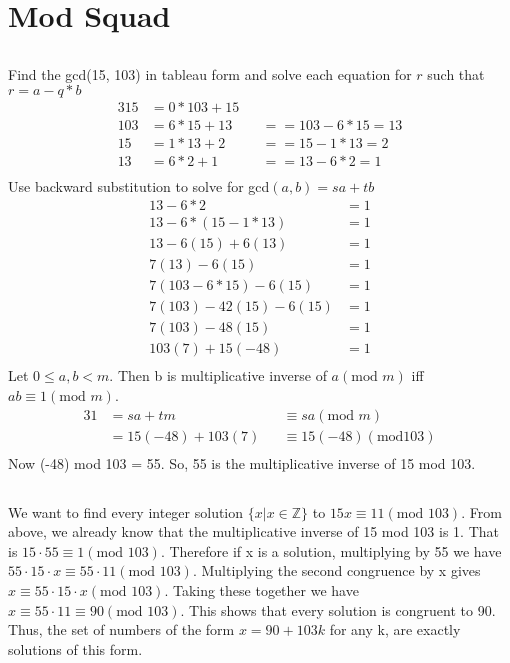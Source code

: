\documentclass[11pt]{article}
\newcommand{\Z}{\mathbb{Z}}
\begin{document}
\section{Mod Squad} %
\subsection{} %
Find the gcd(15, 103) in tableau form and solve each equation for $r$ such that $r = a - q * b$
\begin{alignat*}{3}
	15 &= 0 * 103 + 15 && \\
	103 &= 6 * 15 + 13  &&== 103 - 6 * 15 = 13 \\
	15 &= 1 * 13 + 2 &&== 15 - 1 * 13 = 2 \\
	13 &= 6 * 2 + 1 &&== 13 - 6 * 2 = 1\\
\end{alignat*}
Use backward substitution to solve for gcd$(a, b) = sa + tb$
\begin{align*}
	13 - 6 * 2 &= 1 \\
	13 - 6 * (15 - 1 * 13) &= 1 \\
	13 - 6(15) + 6(13) &= 1 \\
	7(13) - 6(15) &= 1 \\
	7(103 - 6 * 15) - 6(15) &= 1 \\
	7(103) - 42(15) - 6(15) &= 1 \\
	7(103) - 48(15) &= 1 \\
	103(7) + 15(-48) &= 1 \\
\end{align*}
Let $0 \leq a,b < m$. Then b is multiplicative inverse of $a(\text{mod } m)$ iff $ab \equiv 1 (\text{mod } m)$. 
\begin{alignat*}{3}
	1 &= sa + tm &&\equiv sa(\text{mod } m) \\
	&= 15(-48) + 103(7) &&\equiv 15(-48) (\text{mod} 103) \\
\end{alignat*}
Now (-48) mod 103 = 55. So, 55 is the multiplicative inverse of 15 mod 103. 

\subsection{} %
We want to find every integer solution $\{x | x \in \Z\}$ to $15x \equiv 11 (\text{mod } 103)$. From above, we already know that the multiplicative inverse of 15 mod 103 is 1. That is $15 \cdot 55 \equiv 1 (\text{mod } 103)$. Therefore if x is a solution, multiplying by 55 we have $55 \cdot 15 \cdot x \equiv 55 \cdot 11 (\text{mod } 103)$. Multiplying the second congruence by x gives $x \equiv 55 \cdot 15 \cdot x (\text{mod } 103)$. Taking these together we have $x \equiv 55 \cdot 11 \equiv 90 (\text{mod } 103)$. This shows that every solution is congruent to 90. Thus, the set of numbers of the form $x = 90 + 103k$ for any k, are exactly solutions of this form. 
\end{document}
